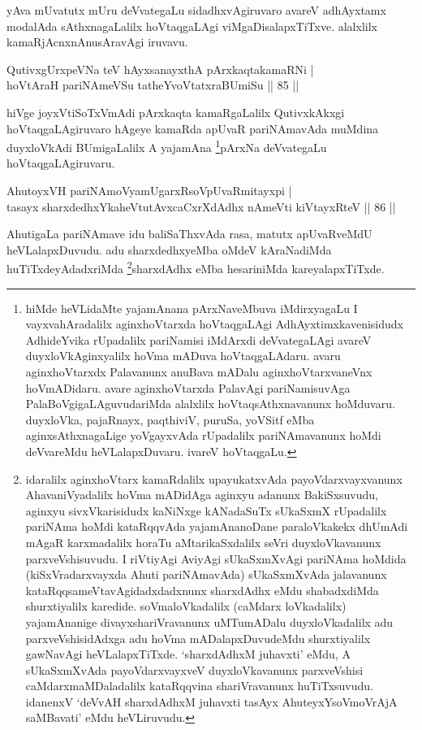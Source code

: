 \begin{artha}
yAva mUvatutx mUru deVvategaLu sidadhxvAgiruvaro avareV adhAyxtamx 
\-modalAda sAthxnagaLalilx hoVtaqgaLAgi viMgaDisalapxTiTxve. alalxlilx 
kamaRjAcnxnAnusAra\-vAgi iruvavu.
\end{artha}

\begin{shl}
QutivxgUrxpeVNa teV hAyxsanayxthA pArxkaqtakamaRNi | \\
hoVtAraH pariNAmeVSu tatheYvoVtatxraBUmiSu \hfill|| 85 || 
\end{shl}

\begin{artha}
hiVge joyxVtiSoTxVmAdi pArxkaqta kamaRgaLalilx QutivxkAkxgi 
hoVtaqgaLAgi\-ruvaro hAgeye kamaRda apUvaR pariNAmavAda muMdina 
duyxloVkAdi BUmigaLalilx A yajamAna \footnote[1]{hiMde heVLidaMte 
yajamAnana pArxNaveMbuva iMdirxyagaLu I vayxvahAradalilx 
aginxhoVtarxda hoVtaqgaLAgi AdhAyxtimxkavenisidudx AdhideYvika 
rUpadalilx pariNamisi iMdArxdi deVvategaLAgi avareV duyxloVkAginxyalilx 
hoVma mADuva hoVtaqgaLAdaru. avaru aginxhoVtarxdx Palavanunx anuBava 
mADalu aginxhoVtarxvaneVnx hoVmADidaru. avare aginxhoVtarxda PalavAgi 
pariNamisuvAga PalaBoVgigaLAguvudariMda alalxlilx hoVtaqsAthxnavanunx 
hoMduvaru. duyxloVka, pajaRnayx, paqthiviV, puruSa, yoVSitf eMba 
aginxsAthxnagaLige yoVgayxvAda rUpadalilx pariNAmavanunx hoMdi 
deVvareMdu heVLalapxDuvaru. ivareV hoVtaqgaLu.}pArxNa deVvategaLu 
hoVtaqgaLAgiruvaru.
\end{artha}


\begin{shl}
AhutoyxVH pariNAmoV\s yamUgarxRsoV\s pUvaRmitayxpi | \\
tasayx sharxdedhxYkaheVtutAvxcaCxrXdAdhx nAmeVti kiVtayxRteV \hfill|| 86 || 
\end{shl}

\begin{artha}
AhutigaLa pariNAmave idu baliSaThxvAda rasa, matutx apUvaRveMdU heVLalapxDuvudu. adu sharxdedhxyeMba oMdeV kAraNadiMda huTiTxdeyAdadxriMda \footnote[2]{idaralilx aginxhoVtarx kamaRdalilx upayukatxvAda payoVdarxvayxvanunx AhavaniVyadalilx hoVma mADidAga aginxyu adanunx BakiSxsuvudu, aginxyu sivxVkarisidudx kaNiNxge kANadaSuTx sUkaSxmX rUpadalilx pariNAma hoMdi kataRqqvAda yajamAnanoDane paraloVkakekx dhUmAdi mAgaR karxmadalilx horaTu aMtarikaSxdalilx seVri duyxloVkavanunx parxveVshisuvudu. I riVtiyAgi AviyAgi sUkaSxmXvAgi pariNAma hoMdida (kiSxVradarxvayxda Ahuti pariNAmavAda) sUkaSxmXvAda jalavanunx kataRqqsameVtavAgidadxdadxnunx sharxdAdhx eMdu shabadxdiMda shurxtiyalilx karedide. soVmaloVkadalilx (caMdarx loVkadalilx) yajamAnanige divayxshariVravanunx uMTumADalu duyxloVkadalilx adu parxveVshisidAdxga adu hoVma mADalapxDuvudeMdu shurxtiyalilx gawNavAgi heVLalapxTiTxde. `sharxdAdhxM juhavxti' eMdu, A sUkaSxmXvAda payoVdarxvayxveV duyxloVkavanunx parxveVshisi caMdarxmaMDaladalilx kataRqqvina shariVravanunx huTiTxsuvudu. idanenxV `deVvAH sharxdAdhxM juhavxti tasAyx AhuteyxYsoVmoVrAjA saMBavati' eMdu heVLiruvudu.}sharxdAdhx eMba hesariniMda kareyalapxTiTxde.
\end{artha}

